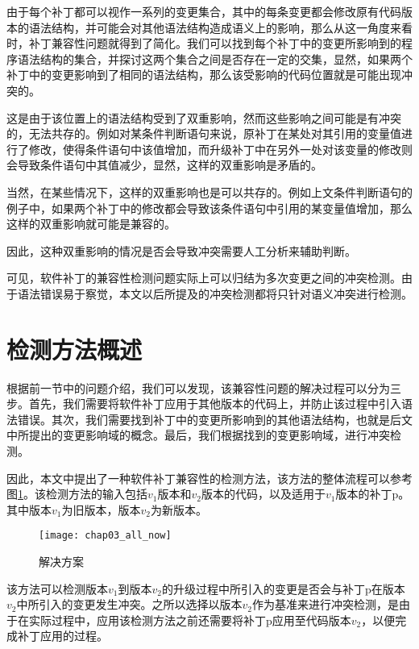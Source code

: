 由于每个补丁都可以视作一系列的变更集合，其中的每条变更都会修改原有代码版本的语法结构，并可能会对其他语法结构造成语义上的影响，那么从这一角度来看时，补丁兼容性问题就得到了简化。我们可以找到每个补丁中的变更所影响到的程序语法结构的集合，并探讨这两个集合之间是否存在一定的交集，显然，如果两个补丁中的变更影响到了相同的语法结构，那么该受影响的代码位置就是可能出现冲突的。

这是由于该位置上的语法结构受到了双重影响，然而这些影响之间可能是有冲突的，无法共存的。例如对某条件判断语句来说，原补丁在某处对其引用的变量值进行了修改，使得条件语句中该值增加，而升级补丁中在另外一处对该变量的修改则会导致条件语句中其值减少，显然，这样的双重影响是矛盾的。

当然，在某些情况下，这样的双重影响也是可以共存的。例如上文条件判断语句的例子中，如果两个补丁中的修改都会导致该条件语句中引用的某变量值增加，那么这样的双重影响就可能是兼容的。

因此，这种双重影响的情况是否会导致冲突需要人工分析来辅助判断。

可见，软件补丁的兼容性检测问题实际上可以归结为多次变更之间的冲突检测。由于语法错误易于察觉，本文以后所提及的冲突检测都将只针对语义冲突进行检测。

\section{检测方法概述}
\label {sec_method}

根据前一节中的问题介绍，我们可以发现，该兼容性问题的解决过程可以分为三步。首先，我们需要将软件补丁应用于其他版本的代码上，并防止该过程中引入语法错误。其次，我们需要找到补丁中的变更所影响到的其他语法结构，也就是后文中所提出的变更影响域的概念。最后，我们根据找到的变更影响域，进行冲突检测。

因此，本文中提出了一种软件补丁兼容性的检测方法，该方法的整体流程可以参考图\ref {all_flow}。该检测方法的输入包括$v_1$版本和$v_2$版本的代码，以及适用于$v_1$版本的补丁p。其中版本$v_1$为旧版本，版本$v_2$为新版本。

\begin{figure}[H]
	\centering
	\texttt{[image: chap03\_all\_now]}
	\caption {解决方案}
	\label {all_flow}	
\end{figure}

该方法可以检测版本$v_1$到版本$v_2$的升级过程中所引入的变更是否会与补丁p在版本$v_2$中所引入的变更发生冲突。之所以选择以版本$v_2$作为基准来进行冲突检测，是由于在实际过程中，应用该检测方法之前还需要将补丁p应用至代码版本$v_2$，以便完成补丁应用的过程。

